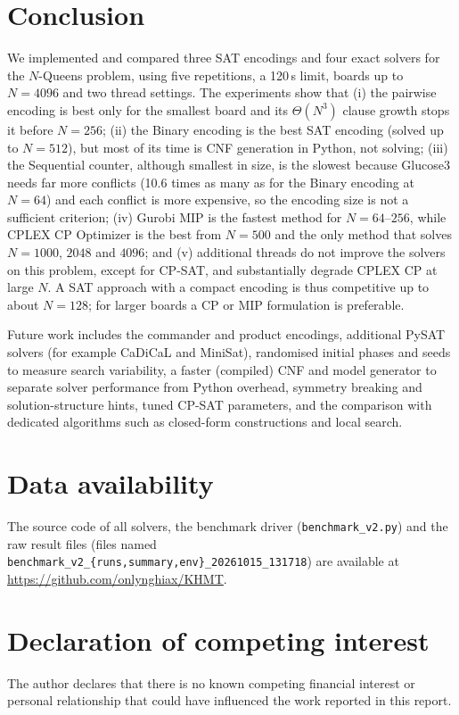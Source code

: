 \documentclass[a4paper,fleqn]{cas-sc}
\begin{document}
\section{Conclusion}\label{sec:conclusion}
We implemented and compared three SAT encodings and four exact solvers for the $N$-Queens problem, using five repetitions, a 120\,s limit, boards up to $N=4096$ and two thread settings.
The experiments show that (i) the pairwise encoding is best only for the smallest board and its $\Theta(N^3)$ clause growth stops it before $N=256$; (ii) the Binary encoding is the best SAT encoding (solved up to $N=512$), but most of its time is CNF generation in Python, not solving; (iii) the Sequential counter, although smallest in size, is the slowest because Glucose3 needs far more conflicts (10.6 times as many as for the Binary encoding at $N=64$) and each conflict is more expensive, so the encoding size is not a sufficient criterion; (iv) Gurobi MIP is the fastest method for $N=64$--$256$, while CPLEX CP Optimizer is the best from $N=500$ and the only method that solves $N=1000$, $2048$ and $4096$; and (v) additional threads do not improve the solvers on this problem, except for CP-SAT, and substantially degrade CPLEX CP at large $N$.
A SAT approach with a compact encoding is thus competitive up to about $N=128$; for larger boards a CP or MIP formulation is preferable.

Future work includes the commander and product encodings, additional PySAT solvers (for example CaDiCaL and MiniSat), randomised initial phases and seeds to measure search variability, a faster (compiled) CNF and model generator to separate solver performance from Python overhead, symmetry breaking and solution-structure hints, tuned CP-SAT parameters, and the comparison with dedicated algorithms such as closed-form constructions and local search.

\FloatBarrier
\section*{Data availability}
The source code of all solvers, the benchmark driver (\texttt{benchmark\_v2.py}) and the raw result files (files named \texttt{benchmark\_v2\_\{runs,summary,env\}\_20261015\_131718}) are available at \url{https://github.com/onlynghiax/KHMT}.

\FloatBarrier
\section*{Declaration of competing interest}
The author declares that there is no known competing financial interest or personal relationship that could have influenced the work reported in this report.
\end{document}
